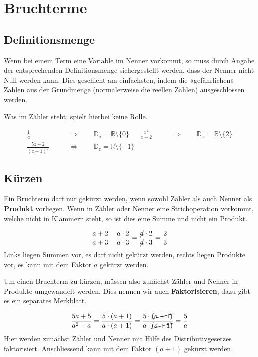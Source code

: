 \newpage
\section{Bruchterme}

\subsection{Definitionsmenge}
Wenn bei einem Term eine Variable im Nenner vorkommt, so muss durch Angabe der entsprechenden Definitionsmenge sichergestellt werden, dass der Nenner nicht Null werden kann. Dies geschieht am einfachsten, indem die «gefährlichen» Zahlen aus der Grundmenge (normalerweise die reellen Zahlen) ausgeschlossen werden.

Was im Zähler steht, spielt hierbei keine Rolle.
\begin{example}
  \begin{align*}
    \frac{1}{a} &\qquad\Rightarrow\qquad \mathbb{D}_{a} = \mathbb{R} \setminus \{0\} &
    \frac{x^{2}}{x-2} &\qquad\Rightarrow\qquad \mathbb{D}_{x} = \mathbb{R} \setminus \{2\} \\[4mm]
    \frac{5z+2}{(z+1)^{2}} &\qquad\Rightarrow\qquad \mathbb{D}_{z} = \mathbb{R} \setminus \{-1\}
  \end{align*}
\end{example}

\subsection{Kürzen}
Ein Bruchterm darf nur gekürzt werden, wenn sowohl Zähler als auch Nenner als \textbf{Produkt} vorliegen. Wenn in Zähler oder Nenner eine Strichoperation vorkommt, welche nicht in Klammern steht, so ist dies eine Summe und nicht ein Produkt.
\begin{example}
  \begin{align*}
    \frac{a+2}{a+3} && \frac{a\cdot 2}{a\cdot 3} = \frac{\cancel{a}\cdot 2}{\cancel{a}\cdot 3}= \frac{2}{3}
  \end{align*}
  Links liegen Summen vor, es darf nicht gekürzt werden, rechts liegen Produkte vor, es kann mit dem Faktor $a$ gekürzt werden.
\end{example}
Um einen Bruchterm zu kürzen, müssen also zunächst Zähler und Nenner in Produkte umgewandelt werden. Dies nennen wir auch \textbf{Faktorisieren}, dazu gibt es ein separates Merkblatt.
\begin{example}
  \begin{align*}
    \frac{5a+5}{a^{2}+a} = \frac{5\cdot (a+1)}{a\cdot (a+1)} = \frac{5\cdot \cancel{(a+1)}}{a\cdot \cancel{(a+1)}} = \frac{5}{a}
  \end{align*}
  Hier werden zunächst Zähler und Nenner mit Hilfe des Distributivgesetzes faktorisiert. Anschliessend kann mit dem Faktor $(a+1)$ gekürzt werden.
\end{example}

